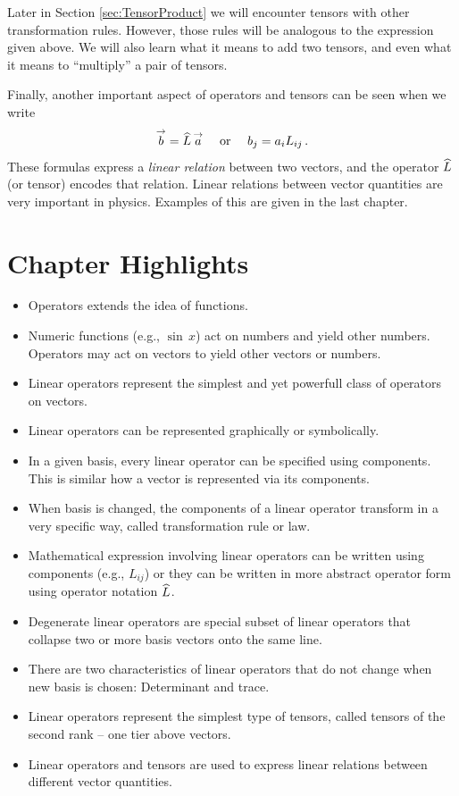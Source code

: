 Later in Section \ref{sec:TensorProduct} we will encounter tensors
with other transformation rules. However, those rules will be
analogous to the expression given
above. We will also learn what it means to add two tensors, and even
what it means to ``multiply'' a pair of tensors.

Finally, another important aspect of operators and tensors can be seen
when we write
\[
\overset{\rightarrow}{b} = \widehat{L}\,\overset{\rightarrow}{a}\quad\textrm{ or }\quad b_j = a_iL_{ij}\,.
\]
These formulas express a \emph{linear relation} between two vectors,
and the operator $\widehat{L}$ (or tensor) encodes that relation. Linear relations
between vector quantities are very important in physics. Examples of
this are given in the last chapter.


\section*{Chapter Highlights}
{\chhc
  \it
  \small
\begin{itemize}
\item Operators extends the idea of functions.
\item Numeric functions (e.g., $\sin\,x$) act on numbers and yield
  other numbers. Operators may act on vectors to yield other vectors
  or numbers.
\item Linear operators represent the simplest and yet powerfull class
  of operators on vectors.
\item Linear operators can be represented graphically or symbolically.
\item In a given basis, every linear operator can be specified using
  components. This is similar how a vector is represented via its
  components.
\item When basis is changed, the components of a linear operator
  transform in a very specific way, called transformation
  rule or law.
\item Mathematical expression involving linear operators can be
  written using components (e.g., $L_{ij}$) or they can be written in
  more abstract operator form using operator notation $\widehat{L}$.
\item Degenerate linear operators are special subset of linear
  operators that collapse two or more basis vectors onto the same line.
\item There are two characteristics of linear operators that do not
  change when new basis is chosen: Determinant and trace.
\item Linear operators represent the simplest type of tensors, called
  tensors of the second rank -- one tier above vectors.
\item Linear operators and tensors are used to express linear relations
  between different vector quantities.
\end{itemize}

}
